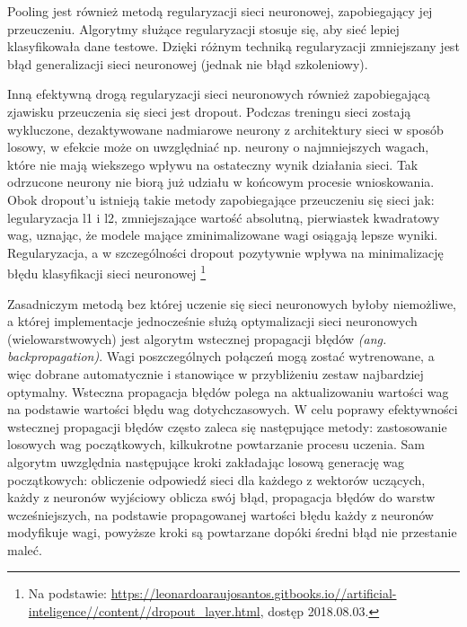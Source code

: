 \documentclass[a4paper,12pt]{article}
\begin{document}
			Pooling jest również metodą regularyzacji sieci neuronowej, zapobiegający jej przeuczeniu. Algorytmy służące regularyzacji stosuje się, aby sieć lepiej klasyfikowała dane testowe. Dzięki różnym techniką regularyzacji zmniejszany jest błąd generalizacji sieci neuronowej (jednak nie błąd szkoleniowy). 
        
        Inną efektywną drogą regularyzacji sieci neuronowych również zapobiegającą zjawisku przeuczenia się sieci jest dropout. 
			Podczas treningu sieci zostają wykluczone, dezaktywowane nadmiarowe neurony z architektury sieci w sposób losowy, 
			w efekcie może on uwzględniać np. neurony o najmniejszych wagach, które nie mają wiekszego wpływu na ostateczny wynik działania sieci. 
			Tak odrzucone neurony nie biorą już udziału w końcowym procesie wnioskowania. Obok dropout'u istnieją takie metody zapobiegające 
			przeuczeniu się sieci jak: legularyzacja l1 i l2, zmniejszające wartość absolutną, pierwiastek kwadratowy wag, uznając, że modele mające 
			zminimalizowane wagi osiągają lepsze wyniki. Regularyzacja, a w szczególności dropout pozytywnie wpływa na minimalizację błędu 
			klasyfikacji sieci neuronowej \footnote{Na podstawie:  \href{https://leonardoaraujosantos.gitbooks.io//artificial-inteligence//content//dropout_layer.html}{\url{https://leonardoaraujosantos.gitbooks.io//artificial-inteligence//content//dropout_layer.html}}, dostęp 2018.08.03.}
        
        Zasadniczym metodą bez której uczenie się sieci neuronowych byłoby niemożliwe, a której implementacje jednocześnie służą optymalizacji sieci neuronowych (wielowarstwowych) jest algorytm wstecznej propagacji błędów 
			\textit{(ang. backpropagation)}. Wagi poszczególnych połączeń mogą zostać wytrenowane, a więc dobrane automatycznie i stanowiące 
			w przybliżeniu zestaw najbardziej optymalny. Wsteczna propagacja błędów polega na aktualizowaniu wartości wag na podstawie wartości błędu 
			wag dotychczasowych. W celu poprawy efektywności wstecznej propagacji błędów często zaleca się następujące metody: 
			zastosowanie losowych wag początkowych, kilkukrotne powtarzanie procesu uczenia. Sam algorytm uwzględnia następujące kroki 
			zakładając losową generację wag początkowych: obliczenie odpowiedź sieci dla każdego z wektorów uczących, 
			każdy z neuronów wyjściowy oblicza swój błąd, propagacja błędów do warstw wcześniejszych, na podstawie propagowanej wartości 
			błędu każdy z neuronów modyfikuje wagi, powyższe kroki są powtarzane dopóki średni błąd nie przestanie maleć.
\end{document}
